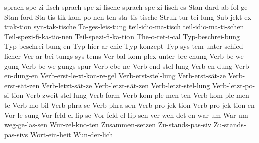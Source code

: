 {sprach-spe-zi-fisch
sprach-spe-zi-fische
sprach-spe-zi-fisch-es
             Stan-dard-ab-fol-ge
Stan-ford
Sta-tis-tik-kom-po-nen-ten
sta-tis-tische
Struk-tur-tei-lung
Sub-jekt-ex-trak-tion
             syn-tak-tische
Ta-ges-leis-tung
teil-idio-ma-tisch
teil-idio-ma-ti-schen
             Teil-spezi-fi-ka-tio-nen
             Teil-spezi-fi-ka-tion
The-o-ret-i-cal
             Typ-beschrei-bung
             Typ-beschrei-bung-en
             Typ-hier-ar-chie
             Typ-konzept
             Typ-sys-tem
	     unter-schied-licher
Ver-ar-bei-tungs-sys-tems
             Ver-bal-kom-plex-unter-bre-chung
Verb-be-we-gung
Verb-be-we-gungs-spur
Verb-ebe-ne
             Verb-end-stel-lung
             Verb-en-dung
             Verb-en-dung-en
Verb-erst-le-xi-kon-re-gel
	     Verb-erst-stel-lung
Verb-erst-s\"at-ze
Verb-erst-s\"at-zen
Verb-letzt-s\"at-ze
Verb-letzt-s\"at-zen
Verb-letzt-stel-lung
Verb-letzt-po-si-tion
	     Verb-zweit-stel-lung
             Verb-form
             Verb-kom-ple-men-ten
             Verb-kom-ple-men-te
Verb-mo-bil
             Verb-phra-se
             Verb-phra-sen
Verb-pro-jek-tion
Verb-pro-jek-tion-en
             Vor-le-sung
             Vor-feld-el-lip-se
             Vor-feld-el-lip-sen
	     ver-wen-det-en
             war-um
             War-um
weg-ge-las-sen
             Wur-zel-kno-ten
             Zusammen-setzen
             Zu-stands-pas-siv
             Zu-stands-pas-sivs
Wort-ein-heit
Wun-der-lich
}

